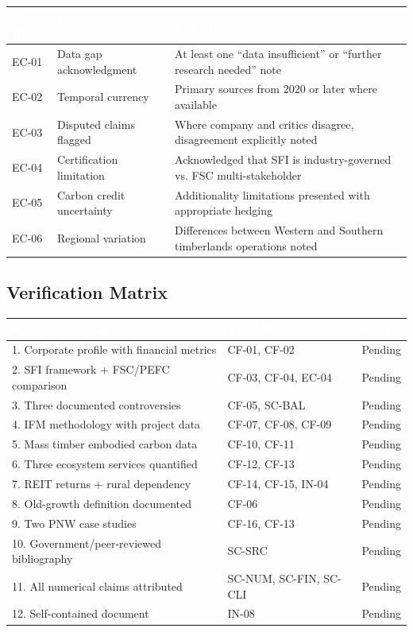 \documentclass[11pt,letterpaper]{article}
\newcommand{\tableheader}[1]{\textbf{\sffamily\textcolor{white}{#1}}}
\begin{document}
\begin{center}
\begin{tabularx}{\textwidth}{C{1.5cm}L{4cm}X}
\toprule
{}
\tableheader{Test ID} & \tableheader{Verifies} & \tableheader{Expected} \\
\midrule
EC-01 & Data gap acknowledgment & At least one ``data insufficient'' or ``further research needed'' note \\
EC-02 & Temporal currency & Primary sources from 2020 or later where available \\
EC-03 & Disputed claims flagged & Where company and critics disagree, disagreement explicitly noted \\
EC-04 & Certification limitation & Acknowledged that SFI is industry-governed vs. FSC multi-stakeholder \\
EC-05 & Carbon credit uncertainty & Additionality limitations presented with appropriate hedging \\
EC-06 & Regional variation & Differences between Western and Southern timberlands operations noted \\
\bottomrule
\end{tabularx}
\end{center}

\subsection{Verification Matrix}

\begin{center}
\begin{tabularx}{\textwidth}{XL{3.5cm}C{1.5cm}}
\toprule
{}
\tableheader{Success Criterion} & \tableheader{Test ID(s)} & \tableheader{Status} \\
. Corporate profile with financial metrics & CF-01, CF-02 & Pending \\
2. SFI framework + FSC/PEFC comparison & CF-03, CF-04, EC-04 & Pending \\
3. Three documented controversies & CF-05, SC-BAL & Pending \\
4. IFM methodology with project data & CF-07, CF-08, CF-09 & Pending \\
5. Mass timber embodied carbon data & CF-10, CF-11 & Pending \\
6. Three ecosystem services quantified & CF-12, CF-13 & Pending \\
7. REIT returns + rural dependency & CF-14, CF-15, IN-04 & Pending \\
8. Old-growth definition documented & CF-06 & Pending \\
9. Two PNW case studies & CF-16, CF-13 & Pending \\
10. Government/peer-reviewed bibliography & SC-SRC & Pending \\
11. All numerical claims attributed & SC-NUM, SC-FIN, SC-CLI & Pending \\
12. Self-contained document & IN-08 & Pending \\
\bottomrule
\end{tabularx}
\end{center}
\end{document}
